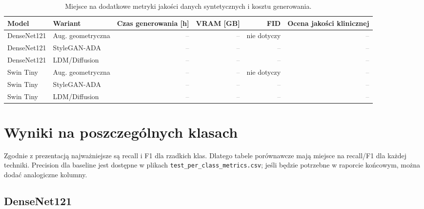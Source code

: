 \documentclass[11pt,a4paper]{article}
\newcommand{\missingresult}{\textcolor{gray}{--}}
\begin{document}
\begin{table}[htbp]
\centering
\small
\caption{Miejsce na dodatkowe metryki jakości danych syntetycznych i kosztu generowania.}
\label{tab:generation-quality}
\begin{tabular}{llrrrr}
\toprule
Model & Wariant & Czas generowania [h] & VRAM [GB] & FID & Ocena jakości klinicznej \\
\midrule
DenseNet121 & Aug. geometryczna & \missingresult & \missingresult & nie dotyczy & \missingresult \\
DenseNet121 & StyleGAN-ADA & \missingresult & \missingresult & \missingresult & \missingresult \\
DenseNet121 & LDM/Diffusion & \missingresult & \missingresult & \missingresult & \missingresult \\
Swin Tiny & Aug. geometryczna & \missingresult & \missingresult & nie dotyczy & \missingresult \\
Swin Tiny & StyleGAN-ADA & \missingresult & \missingresult & \missingresult & \missingresult \\
Swin Tiny & LDM/Diffusion & \missingresult & \missingresult & \missingresult & \missingresult \\
\bottomrule
\end{tabular}
\end{table}

\clearpage
\section{Wyniki na poszczególnych klasach}

Zgodnie z prezentacją najważniejsze są recall i F1 dla rzadkich klas. Dlatego tabele porównawcze
mają miejsce na recall/F1 dla każdej techniki. Precision dla baseline jest dostępne w plikach
\texttt{test\_per\_class\_metrics.csv}; jeśli będzie potrzebne w raporcie końcowym, można dodać
analogiczne kolumny.

\subsection{DenseNet121}
\end{document}

